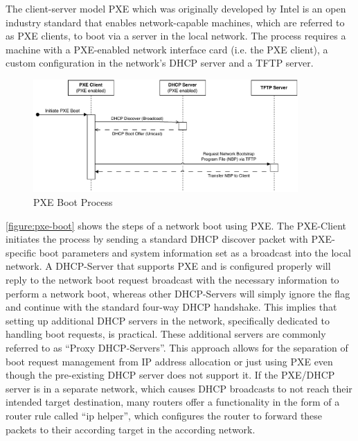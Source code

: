     The client-server model PXE which was originally developed by Intel is an open industry standard that enables network-capable machines, which are referred to as PXE clients, to boot via a server in the local network. The process requires a machine with a PXE-enabled network interface card (i.e. the PXE client), a custom configuration in the network's DHCP server and a TFTP server.\newline

    \begin{figure}[htbp]
        \centering
        \includegraphics[width=0.9\textwidth]{img/pxe-boot.pdf}
        \caption{PXE Boot Process}
        \label{figure:pxe-boot}
    \end{figure}

    \noindent \autoref{figure:pxe-boot} shows the steps of a network boot using PXE. The PXE-Client initiates the process by sending a standard DHCP discover packet with PXE-specific boot parameters and system information set as a broadcast into the local network. A DHCP-Server that supports PXE and is configured properly will reply to the network boot request broadcast with the necessary information to perform a network boot, whereas other DHCP-Servers will simply ignore the flag and continue with the standard four-way DHCP handshake. This implies that setting up additional DHCP servers in the network, specifically dedicated to handling boot requests, is practical. These additional servers are commonly referred to as ``Proxy DHCP-Servers''. This approach allows for the separation of boot request management from IP address allocation or just using PXE even though the pre-existing DHCP server does not support it. If the PXE/DHCP server is in a separate network, which causes DHCP broadcasts to not reach their intended target destination, many routers offer a functionality in the form of a router rule called ``ip helper'', which configures the router to forward these packets to their according target in the according network. \newline 
    
